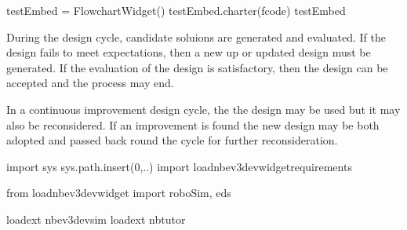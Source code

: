 \documentclass[letterpaper,10pt,english]{sphinxmanual}
\begin{document}
{{\begin{sphinxVerbatim}[commandchars=\\\{\}]
testEmbed = FlowchartWidget()
testEmbed.charter(fcode)
testEmbed

\end{sphinxVerbatim}
}

During the design cycle, candidate soluions are generated and evaluated. If the design fails to meet expectations, then a new up or updated design must be generated. If the evaluation of the design is satisfactory, then the design can be accepted and the process may end.

In a continuous improvement design cycle, the the design may be used but it may also be reconsidered. If an improvement is found the new design may be both adopted and passed back round the cycle for further reconsideration.

{
\begin{sphinxVerbatim}[commandchars=\\\{\}]
\llap{\color{nbsphinxin}[ ]:\,\hspace{\fboxrule}\hspace{\fboxsep}}import sys
sys.path.insert(0,\PYGZsq{}..\PYGZsq{})
import \PYGZus{}load\PYGZus{}nbev3devwidget\PYGZus{}requirements
\end{sphinxVerbatim}
}

{
\begin{sphinxVerbatim}[commandchars=\\\{\}]
\llap{\color{nbsphinxin}[ ]:\,\hspace{\fboxrule}\hspace{\fboxsep}}from \PYGZus{}load\PYGZus{}nbev3devwidget import roboSim, eds

\PYGZpc{}load\PYGZus{}ext nbev3devsim
\PYGZpc{}load\PYGZus{}ext nbtutor
\end{sphinxVerbatim}
}

{
\begin{sphinxVerbatim}[commandchars=\\\{\}]
\llap{\color{nbsphinxin}[ ]:\,\hspace{\fboxrule}\hspace{\fboxsep}}
   
\end{sphinxVerbatim}
}

}
\end{document}
